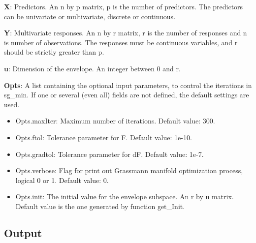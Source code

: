 \documentclass[a4paper,11pt,openany]{memoir}
\begin{document}
\begin{par}
\textbf{X}: Predictors. An n by p matrix, p is the number of predictors. The predictors can be univariate or multivariate, discrete or continuous.
\end{par} \vspace{1em}
\begin{par}
\textbf{Y}: Multivariate responses. An n by r matrix, r is the number of responses and n is number of observations. The responses must be continuous variables, and r should be strictly greater than p.
\end{par} \vspace{1em}
\begin{par}
\textbf{u}: Dimension of the envelope. An integer between 0 and r.
\end{par} \vspace{1em}
\begin{par}
\textbf{Opts}: A list containing the optional input parameters, to control the iterations in sg\_min. If one or several (even all) fields are not defined, the default settings are used.
\end{par} \vspace{1em}
\begin{itemize}
\setlength{\itemsep}{-1ex}
   \item Opts.maxIter: Maximum number of iterations.  Default value: 300.
   \item Opts.ftol: Tolerance parameter for F.  Default value: 1e-10.
   \item Opts.gradtol: Tolerance parameter for dF.  Default value: 1e-7.
   \item Opts.verbose: Flag for print out Grassmann manifold optimization process, logical 0 or 1. Default value: 0.
   \item Opts.init: The initial value for the envelope subspace. An r by u matrix. Default value is the one generated by function get\_Init.

\end{itemize}


\subsection*{Output}
\end{document}
